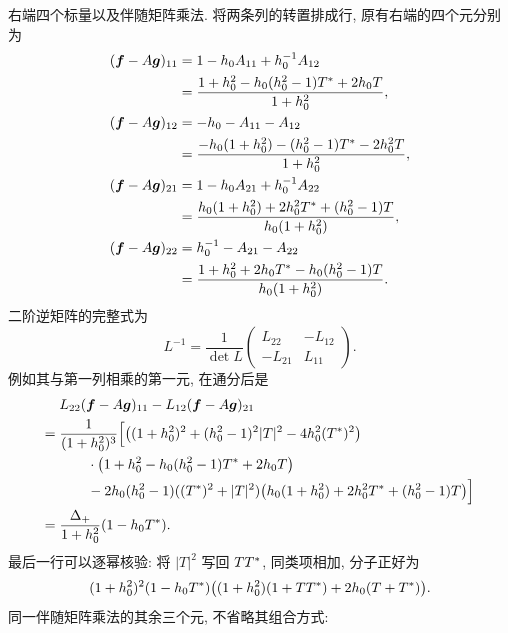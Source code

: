 \par\smallskip\noindent 右端四个标量以及伴随矩阵乘法.\quad
将两条列的转置排成行, 原有右端的四个元分别为
\begin{equation*}
\begin{aligned}
(\boldsymbol f- A\boldsymbol g)_{11}
&=1-h_0 A_{11}+h_0^{-1} A_{12}\\
&=\dfrac{1+h_0^2-h_0(h_0^2-1){T}^{*}+2h_0T}
{1+h_0^2},\\
(\boldsymbol f- A\boldsymbol g)_{12}
&=-h_0- A_{11}- A_{12}\\
&=\dfrac{-h_0(1+h_0^2)-(h_0^2-1){T}^{*}-2h_0^2T}
{1+h_0^2},\\
(\boldsymbol f- A\boldsymbol g)_{21}
&=1-h_0 A_{21}+h_0^{-1} A_{22}\\
&=\dfrac{h_0(1+h_0^2)+2h_0^2{T}^{*}+(h_0^2-1)T}
{h_0(1+h_0^2)},\\
(\boldsymbol f- A\boldsymbol g)_{22}
&=h_0^{-1}- A_{21}- A_{22}\\
&=\dfrac{1+h_0^2+2h_0{T}^{*}-h_0(h_0^2-1)T}
{h_0(1+h_0^2)}.
\end{aligned}
\end{equation*}
二阶逆矩阵的完整式为
\begin{equation*}
L^{-1}
=\dfrac{1}{\det L}
\begin{pmatrix}L_{22}&-L_{12}\\-L_{21}&L_{11}\end{pmatrix}.
\end{equation*}
例如其与第一列相乘的第一元, 在通分后是
\begin{equation*}
\begin{aligned}
&L_{22}(\boldsymbol f- A\boldsymbol g)_{11}
-L_{12}(\boldsymbol f- A\boldsymbol g)_{21}\\
={}&\dfrac{1}{(1+h_0^2)^3}
\Bigl[
\bigl((1+h_0^2)^2+(h_0^2-1)^2|T|^2-4h_0^2({T}^{*})^2\bigr)\\
&\qquad\cdot
\bigl(1+h_0^2-h_0(h_0^2-1){T}^{*}+2h_0T\bigr)\\
&\qquad-2h_0(h_0^2-1)(({T}^{*})^2+|T|^2)
\bigl(h_0(1+h_0^2)+2h_0^2{T}^{*}+(h_0^2-1)T\bigr)
\Bigr]\\
={}&\dfrac{\Delta_+}{1+h_0^2}(1-h_0{T}^{*}).
\end{aligned}
\end{equation*}
最后一行可以逐幂核验: 将 $|T|^2$ 写回 $T{T}^{*}$,
同类项相加, 分子正好为
\begin{equation*}
(1+h_0^2)^2(1-h_0{T}^{*})
\bigl((1+h_0^2)(1+T{T}^{*})+2h_0(T+{T}^{*})\bigr).
\end{equation*}
同一伴随矩阵乘法的其余三个元, 不省略其组合方式:
